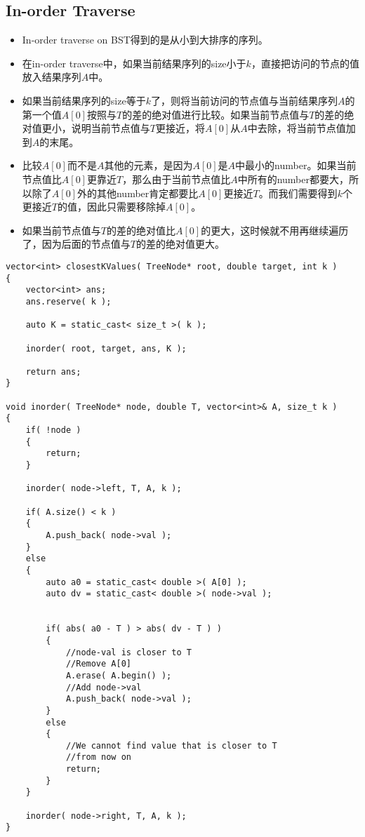 \subsection{In-order Traverse}
\begin{itemize}
\item In-order traverse on BST得到的是从小到大排序的序列。
\item 在in-order traverse中，如果当前结果序列的size小于$k$，直接把访问的节点的值放入结果序列$A$中。
\item 如果当前结果序列的size等于$k$了，则将当前访问的节点值与当前结果序列$A$的第一个值$A[0]$按照与$T$的差的绝对值进行比较。如果当前节点值与$T$的差的绝对值更小，说明当前节点值与$T$更接近，将$A[0]$从$A$中去除，将当前节点值加到$A$的末尾。
\item 比较$A[0]$而不是$A$其他的元素，是因为$A[0]$是$A$中最小的number。如果当前节点值比$A[0]$更靠近$T$，那么由于当前节点值比$A$中所有的number都要大，所以除了$A[0]$外的其他number肯定都要比$A[0]$更接近$T$。而我们需要得到$k$个更接近$T$的值，因此只需要移除掉$A[0]$。
\item 如果当前节点值与$T$的差的绝对值比$A[0]$的更大，这时候就不用再继续遍历了，因为后面的节点值与$T$的差的绝对值更大。
\end{itemize}

\setcounter{lstlisting}{0}
\begin{lstlisting}[style=customc,caption={In-order Traverse}]
vector<int> closestKValues( TreeNode* root, double target, int k )
{
    vector<int> ans;
    ans.reserve( k );

    auto K = static_cast< size_t >( k );

    inorder( root, target, ans, K );

    return ans;
}

void inorder( TreeNode* node, double T, vector<int>& A, size_t k )
{
    if( !node )
    {
        return;
    }

    inorder( node->left, T, A, k );

    if( A.size() < k )
    {
        A.push_back( node->val );
    }
    else
    {
        auto a0 = static_cast< double >( A[0] );
        auto dv = static_cast< double >( node->val );


        if( abs( a0 - T ) > abs( dv - T ) )
        {
            //node-val is closer to T
            //Remove A[0]
            A.erase( A.begin() );
            //Add node->val
            A.push_back( node->val );
        }
        else
        {
            //We cannot find value that is closer to T
            //from now on
            return;
        }
    }

    inorder( node->right, T, A, k );
}
\end{lstlisting}
